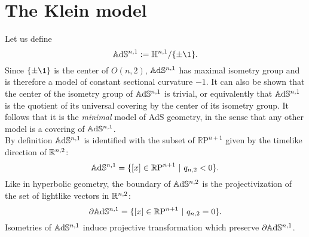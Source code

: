 \section{The Klein model}
Let us define
\[
\A^{n,1} := \H^{n,1} / \{ \pm \1 \}.
\]
Since $\{ \pm \1 \}$ is the center of $O(n,2)$, $\mathbb{A}\mathrm{d}\mathbb{S}^{n,1}$ has maximal isometry group and is therefore a model of constant sectional curvature $-1$.
It can also be shown that the center of the isometry group of $\mathbb{A}\mathrm{d}\mathbb{S}^{n,1}$ is trivial, or equivalently that $\mathbb{A}\mathrm{d}\mathbb{S}^{n,1}$ is the quotient of its universal covering by the center of its isometry group. 
It follows that it is the \emph{minimal} model of AdS geometry, in the sense that any other model is a covering of $\mathbb{A}\mathrm{d}\mathbb{S}^{n,1}$.\\
By definition $\mathbb{A}\mathrm{d}\mathbb{S}^{n,1}$ is identified with the subset of $\mathbb{R} \text{P}^{n+1}$ given by the timelike direction of $\mathbb{R}^{n,2}$:
\[
\mathbb{A}\mathrm{d}\mathbb{S}^{n,1} = \{ \left[ x \right]\in \mathbb{R} \text{P}^{n+1} \ | \ q_{n,2}<0  \}.
\]
Like in hyperbolic geometry, the boundary of $\mathbb{A}\mathrm{d}\mathbb{S}^{n,2}$ is the projectivization of the set of lightlike vectors in $\mathbb{R}^{n,2}$:
\[
\partial\mathbb{A}\mathrm{d}\mathbb{S}^{n,1} = \{ \left[ x \right]\in \mathbb{R} \text{P}^{n+1} \ | \ q_{n,2}=0  \}.
\]
Isometries of $\mathbb{A}\mathrm{d}\mathbb{S}^{n,1}$ induce projective transformation which preserve $\partial \mathbb{A}\mathrm{d}\mathbb{S}^{n,1}$.\\


